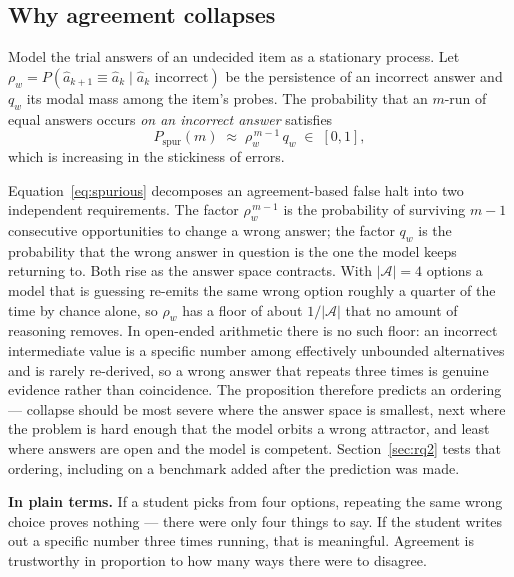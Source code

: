 \documentclass[acmsmall]{acmart}
\newcommand{\intuit}[1]{\begin{intuition}\small\textbf{In plain terms.} #1\end{intuition}}
\theoremstyle{acmdefinition}%
\theoremstyle{acmplain}}{}%
\begin{document}
\subsection{Why agreement collapses}\label{sec:collapse}
\begin{proposition}\label{prop:spurious}
Model the trial answers of an undecided item as a stationary process. Let $\rho_w = P(\hat a_{k+1} \equiv \hat a_k \mid \hat a_k \text{ incorrect})$ be the persistence of an incorrect answer and $q_w$ its modal mass among the item's probes. The probability that an $m$-run of equal answers occurs \emph{on an incorrect answer} satisfies
\begin{equation}
P_{\mathrm{spur}}(m) \;\approx\; \rho_w^{\,m-1}\, q_w \;\in\; [0,1],
\label{eq:spurious}
\end{equation}
which is increasing in the stickiness of errors.
\end{proposition}

Equation~\eqref{eq:spurious} decomposes an agreement-based false halt into two independent requirements. The factor $\rho_w^{\,m-1}$ is the probability of surviving $m-1$ consecutive opportunities to change a wrong answer; the factor $q_w$ is the probability that the wrong answer in question is the one the model keeps returning to. Both rise as the answer space contracts. With $|\mathcal{A}|=4$ options a model that is guessing re-emits the same wrong option roughly a quarter of the time by chance alone, so $\rho_w$ has a floor of about $1/|\mathcal{A}|$ that no amount of reasoning removes. In open-ended arithmetic there is no such floor: an incorrect intermediate value is a specific number among effectively unbounded alternatives and is rarely re-derived, so a wrong answer that repeats three times is genuine evidence rather than coincidence. The proposition therefore predicts an ordering --- collapse should be most severe where the answer space is smallest, next where the problem is hard enough that the model orbits a wrong attractor, and least where answers are open and the model is competent. Section~\ref{sec:rq2} tests that ordering, including on a benchmark added after the prediction was made.

\intuit{If a student picks from four options, repeating the same wrong choice proves nothing --- there were only four things to say. If the student writes out a specific number three times running, that is meaningful. Agreement is trustworthy in proportion to how many ways there were to disagree.}
\end{document}
